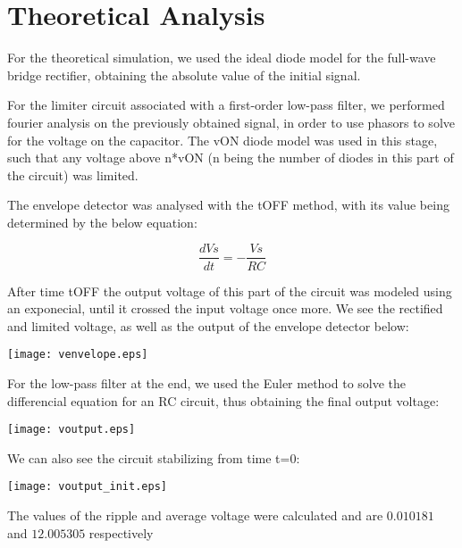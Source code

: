 \section{Theoretical Analysis}
\label{sec:analysis}

For the theoretical simulation, we used the ideal diode model for the full-wave bridge rectifier, obtaining the absolute value of the initial signal.

For the limiter circuit associated with a first-order low-pass filter, we performed fourier analysis on the previously obtained signal, in order to use phasors to solve for the voltage on the capacitor.
The vON diode model was used in this stage, such that any voltage above n*vON (n being the number of diodes in this part of the circuit) was limited.

The envelope detector was analysed with the tOFF method, with its value being determined by the below equation:

\begin{equation}
	\frac{dVs}{dt}=-\frac{Vs}{RC}
\end{equation}

After time tOFF the output voltage of this part of the circuit was modeled using an exponecial, until it crossed the input voltage once more.
We see the rectified and limited voltage, as well as the output of the envelope detector below:

\texttt{[image: venvelope.eps]}

For the low-pass filter at the end, we used the Euler method to solve the differencial equation for an RC circuit, thus obtaining the final output voltage:

\texttt{[image: voutput.eps]}

We can also see the circuit stabilizing from time t=0:

\texttt{[image: voutput\_init.eps]}


The values of the ripple and average voltage were calculated and are $0.010181$
and $12.005305$ respectively

